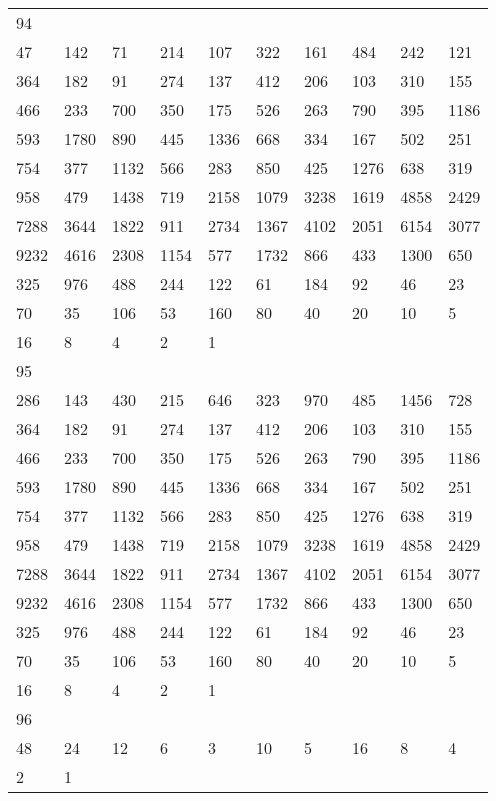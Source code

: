\begin{longtable}{*{10}{l}}
94&&&&&&&&&\\
47& 142& 71& 214& 107& 322& 161& 484& 242& 121\\
364& 182& 91& 274& 137& 412& 206& 103& 310& 155\\
466& 233& 700& 350& 175& 526& 263& 790& 395& 1186\\
593& 1780& 890& 445& 1336& 668& 334& 167& 502& 251\\
754& 377& 1132& 566& 283& 850& 425& 1276& 638& 319\\
958& 479& 1438& 719& 2158& 1079& 3238& 1619& 4858& 2429\\
7288& 3644& 1822& 911& 2734& 1367& 4102& 2051& 6154& 3077\\
9232& 4616& 2308& 1154& 577& 1732& 866& 433& 1300& 650\\
325& 976& 488& 244& 122& 61& 184& 92& 46& 23\\
70& 35& 106& 53& 160& 80& 40& 20& 10& 5\\
16& 8& 4& 2& 1& \\

95&&&&&&&&&\\
286& 143& 430& 215& 646& 323& 970& 485& 1456& 728\\
364& 182& 91& 274& 137& 412& 206& 103& 310& 155\\
466& 233& 700& 350& 175& 526& 263& 790& 395& 1186\\
593& 1780& 890& 445& 1336& 668& 334& 167& 502& 251\\
754& 377& 1132& 566& 283& 850& 425& 1276& 638& 319\\
958& 479& 1438& 719& 2158& 1079& 3238& 1619& 4858& 2429\\
7288& 3644& 1822& 911& 2734& 1367& 4102& 2051& 6154& 3077\\
9232& 4616& 2308& 1154& 577& 1732& 866& 433& 1300& 650\\
325& 976& 488& 244& 122& 61& 184& 92& 46& 23\\
70& 35& 106& 53& 160& 80& 40& 20& 10& 5\\
16& 8& 4& 2& 1& \\

96&&&&&&&&&\\
48& 24& 12& 6& 3& 10& 5& 16& 8& 4\\
2& 1& \\


\end{longtable}

